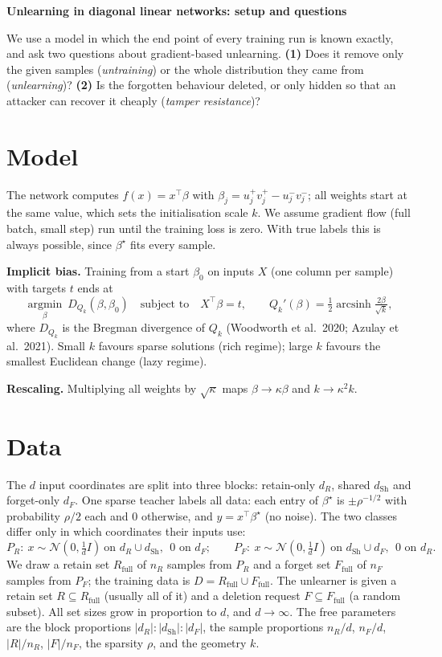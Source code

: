 \documentclass[10pt]{article}
\newcommand{\Rf}{R_{\mathrm{full}}}
\newcommand{\Ff}{F_{\mathrm{full}}}
\newcommand{\dSh}{d_{\mathrm{Sh}}}
\begin{document}
\setlength{\abovedisplayskip}{4pt}\setlength{\belowdisplayskip}{4pt}
\setlength{\abovedisplayshortskip}{2pt}\setlength{\belowdisplayshortskip}{2pt}

{\Large\bfseries Unlearning in diagonal linear networks: setup and questions}

\medskip
We use a model in which the end point of every training run is known exactly, and ask two questions about gradient-based unlearning.
\textbf{(1)} Does it remove only the given samples (\emph{untraining}) or the whole distribution they came from (\emph{unlearning})?
\textbf{(2)} Is the forgotten behaviour deleted, or only hidden so that an attacker can recover it cheaply (\emph{tamper resistance})?

\section{Model}
The network computes $f(x)=x^\top\beta$ with $\beta_j=u_j^+v_j^+-u_j^-v_j^-$; all weights start at the same value, which sets the initialisation scale $k$. We assume gradient flow (full batch, small step) run until the training loss is zero. With true labels this is always possible, since $\beta^\star$ fits every sample.

\textbf{Implicit bias.} Training from a start $\beta_0$ on inputs $X$ (one column per sample) with targets $t$ ends at
\[
\operatorname*{argmin}_\beta\ D_{Q_k}(\beta,\beta_0)\quad\text{subject to}\quad X^\top\beta=t,
\qquad Q_k'(\beta)=\tfrac12\operatorname{arcsinh}\tfrac{2\beta}{\sqrt k},
\]
where $D_{Q_k}$ is the Bregman divergence of $Q_k$ (Woodworth et al.\ 2020; Azulay et al.\ 2021). Small $k$ favours sparse solutions (rich regime); large $k$ favours the smallest Euclidean change (lazy regime).

\textbf{Rescaling.} Multiplying all weights by $\sqrt\kappa$ maps $\beta\to\kappa\beta$ and $k\to\kappa^2k$.

\section{Data}
The $d$ input coordinates are split into three blocks: retain-only $d_R$, shared $\dSh$ and forget-only $d_F$. One sparse teacher labels all data: each entry of $\beta^\star$ is $\pm\rho^{-1/2}$ with probability $\rho/2$ each and $0$ otherwise, and $y=x^\top\beta^\star$ (no noise). The two classes differ only in which coordinates their inputs use:
\[
P_R:\ x\sim\mathcal N(0,\tfrac1d I)\ \text{on } d_R\cup\dSh,\ \ 0 \text{ on } d_F;
\qquad
P_F:\ x\sim\mathcal N(0,\tfrac1d I)\ \text{on } \dSh\cup d_F,\ \ 0 \text{ on } d_R .
\]
We draw a retain set $\Rf$ of $n_R$ samples from $P_R$ and a forget set $\Ff$ of $n_F$ samples from $P_F$; the training data is $D=\Rf\cup\Ff$. The unlearner is given a retain set $R\subseteq\Rf$ (usually all of it) and a deletion request $F\subseteq\Ff$ (a random subset). All set sizes grow in proportion to $d$, and $d\to\infty$. The free parameters are the block proportions $|d_R|:|\dSh|:|d_F|$, the sample proportions $n_R/d$, $n_F/d$, $|R|/n_R$, $|F|/n_F$, the sparsity $\rho$, and the geometry $k$.
\end{document}

